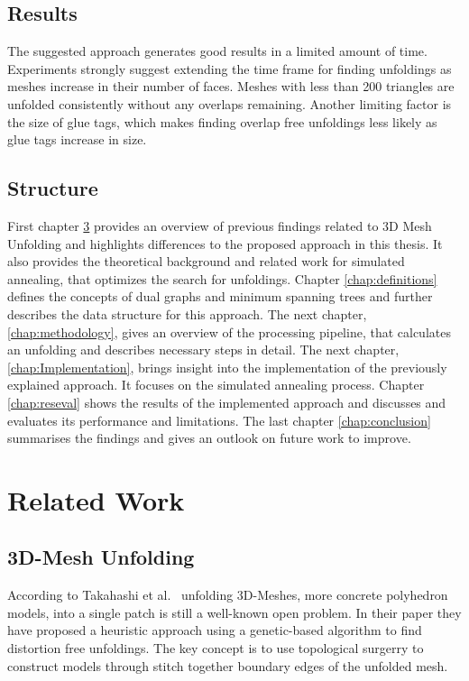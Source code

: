 \documentclass[draft,final]{vutinfth} %
\begin{document}
\section{Results}
The suggested approach generates good results in a limited amount of time. Experiments strongly suggest extending the time frame for finding unfoldings as meshes increase in their number of faces. Meshes with less than 200 triangles are unfolded consistently without any overlaps remaining. Another limiting factor is the size of glue tags, which makes finding overlap free unfoldings less likely as glue tags increase in size.

\section{Structure}
First chapter \ref{chap:relatedwork} provides an overview of previous findings related to 3D Mesh Unfolding and highlights differences to the proposed approach in this thesis. It also provides the theoretical background and related work for simulated annealing, that optimizes the search for unfoldings. Chapter \ref{chap:definitions} defines the concepts of dual graphs and minimum spanning trees and further describes the data structure for this approach. The next chapter, \ref{chap:methodology}, gives an overview of the processing pipeline, that calculates an unfolding and describes necessary steps in detail. The next chapter, \ref{chap:Implementation}, brings insight into the implementation of the previously explained approach. It focuses on the simulated annealing process. Chapter \ref{chap:reseval} shows the results of the implemented approach and discusses and evaluates its performance and limitations. The last chapter \ref{chap:conclusion} summarises the findings and gives an outlook on future work to improve.

\chapter{Related Work}
\label{chap:relatedwork}

\section{3D-Mesh Unfolding}
According to Takahashi et al.~\cite{takahashi2011optimized} unfolding 3D-Meshes, more concrete polyhedron models, into a single patch is still a well-known open problem. In their paper they have proposed a heuristic approach using a genetic-based algorithm to find distortion free unfoldings. The key concept is to use topological surgerry to construct models through stitch together boundary edges of the unfolded mesh.
\end{document}
